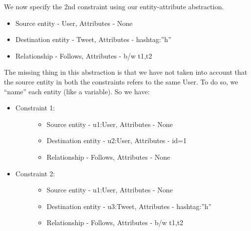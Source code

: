 \documentclass[letterpaper,10pt,english]{sphinxmanual}
\begin{document}
We now specify the 2nd constraint using our entity-attribute abstraction.
\begin{itemize}
\item {} 
Source entity - User, Attributes - None

\item {} 
Destination entity - Tweet, Attributes - hashtag:”h”

\item {} 
Relationship - Follows, Attributes - b/w t1,t2

\end{itemize}

The missing thing in this abstraction is that we have not taken into account that the source entity in both the constraints refers to the same User. To do so, we “name” each entity (like a variable). So we have:
\begin{itemize}
\item {} \begin{description}
\item[{Constraint 1:}] \leavevmode\begin{itemize}
\item {} 
Source entity - u1:User, Attributes - None

\item {} 
Destination entity - u2:User, Attributes - id=1

\item {} 
Relationship - Follows, Attributes - None

\end{itemize}

\end{description}

\item {} \begin{description}
\item[{Constraint 2:}] \leavevmode\begin{itemize}
\item {} 
Source entity - u1:User, Attributes - None

\item {} 
Destination entity - u3:Tweet, Attributes - hashtag:”h”

\item {} 
Relationship - Follows, Attributes - b/w t1,t2

\end{itemize}

\end{description}

\end{itemize}
\end{document}
